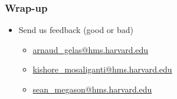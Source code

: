 % 

% 

% 

% 

% 

% 

% 

% 

\begin{frame}
\frametitle{Wrap-up}
\begin{itemize}
  \item Send us feedback (good or bad)
  \begin{itemize}
    \item \url{arnaud_gelas@hms.harvard.edu} 
    \item \url{kishore_mosaliganti@hms.harvard.edu} 
    \item \url{sean_megason@hms.harvard.edu}
  \end{itemize}
\end{itemize}
\end{frame}

